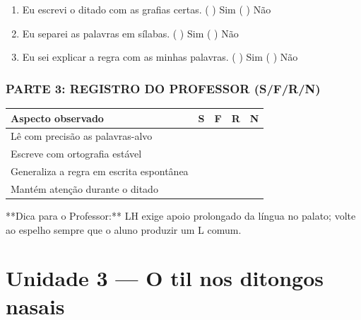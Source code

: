 \begin{exercicio}
\begin{enumerate}[label=\alph*)]
  \item Eu escrevi o ditado com as grafias certas.  \quad ( ) Sim   ( ) Não

  \item Eu separei as palavras em sílabas.  \quad ( ) Sim   ( ) Não

  \item Eu sei explicar a regra com as minhas palavras.  \quad ( ) Sim   ( ) Não

\end{enumerate}

\subsection*{PARTE 3: REGISTRO DO PROFESSOR (S/F/R/N)}

\begin{center}
\renewcommand{\arraystretch}{1.4}
\begin{tabular}{@{}p{9cm}cccc@{}}
\toprule
Aspecto observado & S & F & R & N \\
\midrule
Lê com precisão as palavras-alvo & & & & \\
Escreve com ortografia estável & & & & \\
Generaliza a regra em escrita espontânea & & & & \\
Mantém atenção durante o ditado & & & & \\
\bottomrule\end{tabular}\end{center}

\end{exercicio}

\begin{dica}
**Dica para o Professor:** LH exige apoio prolongado da língua no palato; volte ao espelho sempre que o aluno produzir um L comum.
\end{dica}


\chapter{Unidade 3 --- O til nos ditongos nasais}


